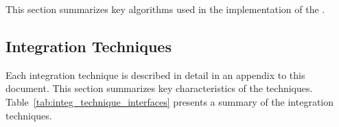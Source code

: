 This section summarizes key algorithms used in the implementation
of the \ModelDesc.

\subsection{Integration Techniques}

Each integration technique is described in detail in an appendix to this
document. This section summarizes key characteristics of the techniques.
Table~\ref{tab:integ_technique_interfaces} presents a summary of
the integration techniques.

\newcommand\enumnamesboth[2]{%
  \multicolumn{1}{l}{{\tt #1}} &
  \multicolumn{1}{l|}{{\tt #2}}}
\newcommand\enumnamesfirst[1]{%
  \multicolumn{1}{l}{{\tt #1}} &
  \multicolumn{1}{l|}{N/A}}
\newcommand\enumnamesnone{%
  \multicolumn{1}{l}{N/A} &
  \multicolumn{1}{l|}{N/A}}

